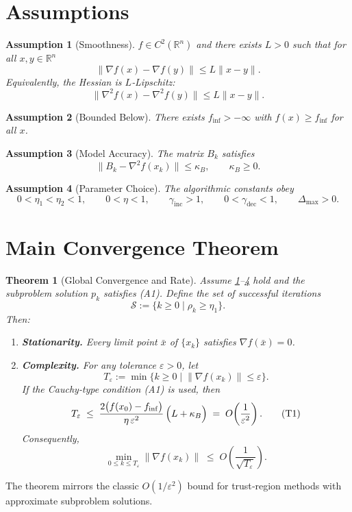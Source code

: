 \documentclass[11pt]{article}
\newtheorem{theorem}{Theorem}
\newtheorem{assumption}{Assumption}
\newcommand{\norm}[1]{\left\lVert#1\right\rVert}
\newcommand{\R}{\mathbb{R}}
\begin{document}
\section*{Assumptions}
\begin{assumption}[Smoothness]\label{as:smooth}
$f\in C^{2}(\R^{n})$ and there exists $L>0$ such that for all $x,y\in\R^{n}$
\[
\|\nabla f(x)-\nabla f(y)\|\le L\|x-y\|.
\]
Equivalently, the Hessian is $L$‑Lipschitz:
\[
\|\nabla^{2}f(x)-\nabla^{2}f(y)\|\le L\|x-y\|.
\]
\end{assumption}

\begin{assumption}[Bounded Below]\label{as:bound}
There exists $f_{\inf}>-\infty$ with $f(x)\ge f_{\inf}$ for all $x$.
\end{assumption}

\begin{assumption}[Model Accuracy]\label{as:model}
The matrix $B_k$ satisfies
\[
\|B_k-\nabla^{2}f(x_k)\|\le \kappa_B,\qquad \kappa_B\ge0.
\]
\end{assumption}

\begin{assumption}[Parameter Choice]\label{as:param}
The algorithmic constants obey
\[
0<\eta_1<\eta_2<1,\qquad
0<\eta<1,\qquad
\gamma_{\text{inc}}>1,\qquad
0<\gamma_{\text{dec}}<1,\qquad
\Delta_{\max}>0.
\]
\end{assumption}

\section*{Main Convergence Theorem}
\begin{theorem}[Global Convergence and Rate]\label{thm:global}
Assume \ref{as:smooth}–\ref{as:param} hold and the subproblem solution $p_k$ satisfies (A1).  
Define the set of \emph{successful} iterations
\[
\mathcal{S}:=\{k\ge0\mid \rho_k\ge\eta_1\}.
\]
Then:
\begin{enumerate}[label=(\roman*),leftmargin=*,itemsep=0.3em]
\item \textbf{Stationarity.} Every limit point $\bar x$ of $\{x_k\}$ satisfies $\nabla f(\bar x)=0$.
\item \textbf{Complexity.} For any tolerance $\varepsilon>0$, let
\[
T_{\varepsilon}:=\min\{k\ge0\mid \norm{\nabla f(x_k)}\le\varepsilon\}.
\]
If the Cauchy‑type condition (A1) is used, then
\[
T_{\varepsilon}\;\le\; \frac{2\bigl(f(x_0)-f_{\inf}\bigr)}{\eta\,\varepsilon^{2}}\,\Bigl(L+\kappa_B\Bigr)
\;=\;O\!\left(\frac{1}{\varepsilon^{2}}\right).
\tag{T1}
\]
Consequently,
\[
\min_{0\le k\le T_{\varepsilon}} \norm{\nabla f(x_k)}\;\le\;O\!\left(\frac{1}{\sqrt{T_{\varepsilon}}}\right).
\]
\end{enumerate}
\end{theorem}
The theorem mirrors the classic $O(1/\varepsilon^{2})$ bound for trust‑region methods with approximate subproblem solutions.
\end{document}
